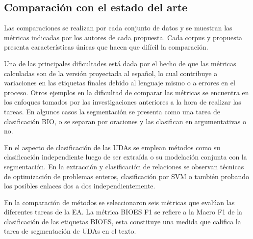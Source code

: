 \documentclass[a4paper,11pt,twocolumn,twoside]{article}
\begin{document}


\subsection{Comparación con el estado del arte}

Las comparaciones se realizan por cada conjunto de datos y se muestran las 
métricas indicadas por los autores de cada propuesta. Cada corpus y propuesta 
presenta características únicas que hacen que difícil la comparación. 

Una de las principales dificultades está dada por el hecho de que las métricas calculadas son de la versión proyectada
al español, lo cual contribuye a variaciones en las etiquetas finales debido al lenguaje mismo 
o a errores en el proceso. Otros ejemplos en la dificultad de comparar las métricas se encuentra
en los enfoques tomados por las investigaciones anteriores a la hora de realizar las tareas.
En algunos casos la segmentación se presenta como una tarea de clasificación BIO, o
se separan por oraciones y las clasifican en argumentativas o no.

En el aspecto de clasificación
de las UDAs se emplean métodos como su clasificación independiente luego de ser extraída o su modelación
conjunta con la segmentación. En la extracción y clasificación de relaciones se observan técnicas de 
optimización de problemas enteros, clasificación por SVM o también probando los posibles enlaces dos 
a dos independientemente.

En la comparación de métodos se seleccionaron seis métricas que evalúan las diferentes 
tareas de la EA. La métrica BIOES F1 se refiere 
a la Macro F1 de la clasificación de las etiquetas BIOES, esta constituye una medida
que califica la tarea de segmentación de UDAs en el texto. 
\end{document}
